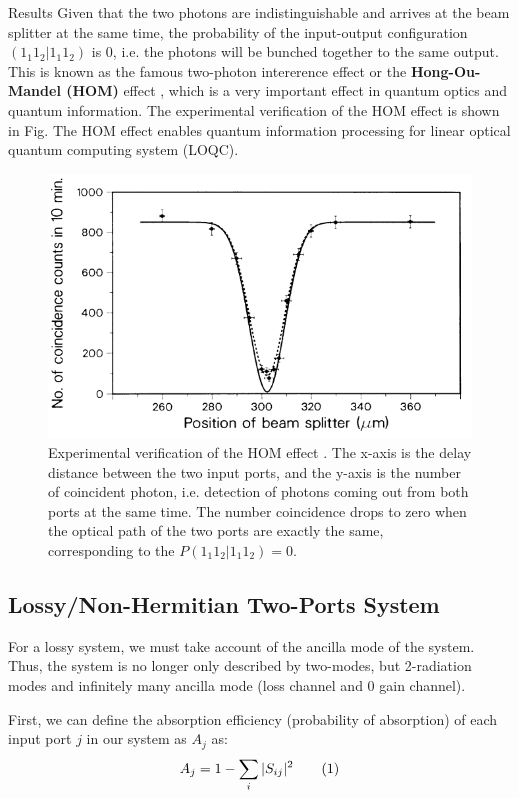 \documentclass[%
 aps,
 reprint,
 twocolumn,
 amsmath,amssymb,
floatfix,
]{revtex4-2}
\newcommand\tagthis{\addtocounter{equation}{1}\tag{\theequation}}
\begin{document}
\begin{section}{Results}
Given that the two photons are indistinguishable and arrives at the beam splitter at the same time, the probability of the input-output configuration $(1_1 1_2| 1_1 1_2)$ is 0, i.e. the photons will be bunched together to the same output. This is known as the famous two-photon intererence effect or the {\bf Hong-Ou-Mandel (HOM)} effect \cite{hong_measurement_1987}, which is a very important effect in quantum optics and quantum information. The experimental verification of the HOM effect is shown in Fig. The HOM effect enables quantum information processing for linear optical quantum computing system (LOQC).

\begin{figure}
	\centering
	\includegraphics[width=\linewidth]{figures/hom.png}
	\caption{Experimental verification of the HOM effect \cite{hong_measurement_1987}. The x-axis is the delay distance between the two input ports, and the y-axis is the number of coincident photon, i.e. detection of photons coming out from both ports at the same time. The number coincidence drops to zero when the optical path of the two ports are exactly the same, corresponding to the $P(1_1 1_2 | 1_1 1_2) = 0$.}
	\label{fig:hom}
\end{figure}

\subsection{Lossy/Non-Hermitian Two-Ports System}
For a lossy system, we must take account of the ancilla mode of the system. Thus, the system is no longer only described by two-modes, but 2-radiation modes and infinitely many ancilla mode (loss channel and 0 gain channel).

First, we can define the absorption efficiency (probability of absorption) of each input port $j$ in our system as $A_j$ as:
\begin{align}
	A_j = 1 - \sum_{i} |S_{ij}|^2 \tagthis \label{eq:absorption}
\end{align}


\end{section}
\end{document}
